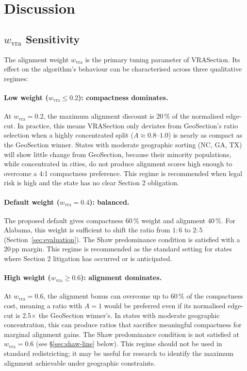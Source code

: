 \section{Discussion}
\label{sec:discussion}

\subsection{$w_\text{vra}$ Sensitivity}

The alignment weight $w_\text{vra}$ is the primary tuning parameter of
VRASection.
Its effect on the algorithm's behaviour can be characterised across
three qualitative regimes:

\paragraph{Low weight ($w_\text{vra} \leq 0.2$): compactness dominates.}
At $w_\text{vra} = 0.2$, the maximum alignment discount is 20\,\% of the
normalised edge-cut.
In practice, this means VRASection only deviates from GeoSection's
ratio selection when a highly concentrated split ($A \approx 0.8$--$1.0$)
is nearly as compact as the GeoSection winner.
States with moderate geographic sorting (NC, GA, TX) will show little
change from GeoSection, because their minority populations, while
concentrated in cities, do not produce alignment scores high enough to
overcome a 4:1 compactness preference.
This regime is recommended when legal risk is high and the state has no
clear Section 2 obligation.

\paragraph{Default weight ($w_\text{vra} = 0.4$): balanced.}
The proposed default gives compactness 60\,\% weight and alignment 40\,\%.
For Alabama, this weight is sufficient to shift the ratio from $1:6$ to $2:5$
(Section~\ref{sec:evaluation}).
The Shaw predominance condition is satisfied with a 20\,pp margin.
This regime is recommended as the standard setting for states where
Section 2 litigation has occurred or is anticipated.

\paragraph{High weight ($w_\text{vra} \geq 0.6$): alignment dominates.}
At $w_\text{vra} = 0.6$, the alignment bonus can overcome up to 60\,\% of
the compactness cost, meaning a ratio with $A = 1$ would be preferred
even if its normalised edge-cut is 2.5$\times$ the GeoSection winner's.
In states with moderate geographic concentration, this can produce ratios
that sacrifice meaningful compactness for marginal alignment gains.
The Shaw predominance condition is not satisfied at $w_\text{vra} = 0.6$
(see \S\ref{sec:shaw-line} below).
This regime should not be used in standard redistricting; it may be useful
for research to identify the maximum alignment achievable under geographic
constraints.

